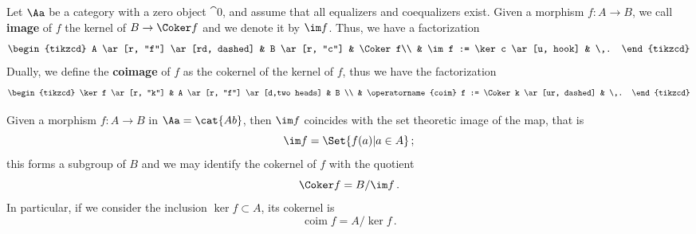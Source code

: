\begin{df}
    Let $\Aa$ be a category with a zero object $\cat{0}$,
    and assume that all equalizers and coequalizers exist.
    Given a morphism $f:A \to B$, we call \textbf{image} of $f$
    the kernel of $B \to \Coker f$ and we denote it by $\im f$.
    Thus, we have a factorization
    \begin{equation*}
        \begin{tikzcd}
            A \ar[r, "f"] \ar[rd, dashed] & B \ar[r, "c"] & \Coker f\\
            & \im f := \ker c \ar[u, hook] & \,.
        \end{tikzcd}
    \end{equation*}
    Dually, we define the \textbf{coimage} of $f$ as the cokernel of the kernel of $f$,
    thus we have the factorization
    \begin{equation*}
        \begin{tikzcd}
            \ker f \ar[r, "k"] & A \ar[r, "f"] \ar[d,two heads] & B \\
            & \operatorname{coim} f := \Coker k \ar[ur, dashed] & \,.
        \end{tikzcd}
    \end{equation*}
\end{df}

\begin{ex}
    Given a morphism $f : A \to B$ in $\Aa = \cat{Ab}$, then $\im f$ coincides
    with the set theoretic image of the map, that is
    \begin{equation*}
        \im f = \Set{f(a) | a \in A}\,;
    \end{equation*}
    this forms a subgroup of $B$ and we may identify the cokernel of $f$
    with the quotient
    \begin{equation*}
        \Coker f = B/\im f\,.
    \end{equation*}
    In particular, if we consider the inclusion $\ker f \subset A$,
    its cokernel is
    \begin{equation*}
        \operatorname{coim} f = A/\ker f\,.
    \end{equation*}
\end{ex}

